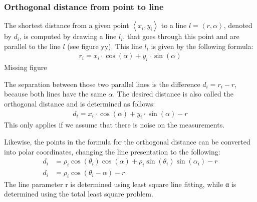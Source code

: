 \documentclass[../Head/Main.tex]{subfiles}
\begin{document}
\subsubsection{Orthogonal distance from point to line}
The shortest distance from a given point $\left\langle x_i, y_i \right\rangle$ to a line $l=\left\langle r, \alpha \right\rangle$, denoted by $d_i$, is computed by drawing a line $l_i$, that goes through this point and are parallel to the line $l$ (see figure yy).  This line $l_i$ is given by the following formula:
\begin{align}
    r_i = x_i\cdot\cos(\alpha)+y_i\cdot\sin(\alpha)
\end{align}
{\color{red} Missing figure} \par
The separation between those two parallel lines is the difference $d_i = r_i - r$, because both lines have the same $\alpha$. The desired distance is also called the orthogonal distance and is determined as follows:
\begin{align}
    d_i = x_i\cdot\cos(\alpha)+y_i\cdot\sin(\alpha) - r
\end{align}
This only applies if we assume that there is noise on the measurements.\par
Likewise, the points in the formula for the orthogonal distance can be converted into polar coordinates, changing the line presentation to the following:
\begin{align}
    d_i &= \rho_i\cos(\theta_i)\cos(\alpha) + \rho_i\sin(\theta_i)\sin(\alpha_i) - r \\
    d_i &= \rho_i\cos(\theta_i - \alpha) - r
\end{align}
The line parameter r is determined using least square line fitting, while α is determined using the total least square problem.   
\end{document}
